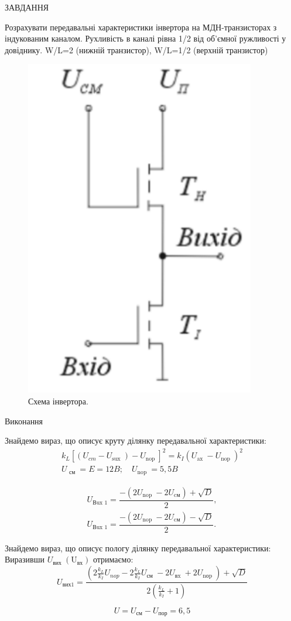 \documentclass[a4paper,14pt]{extreport}
\begin{document}
\begin{center}ЗАВДАННЯ\end{center}

Розрахувати передавальні характеристики інвертора на МДН-транзисторах з 
індукованим каналом. Рухливість в каналі рівна 1/2 від об'ємної ружливості у довіднику. 
W/L=2 (нижній транзистор), W/L=1/2 (верхній транзистор)



\begin{figure}[h]
  \begin{center}
    \includegraphics[width= 0.25\linewidth]{1.png}
  \end{center}
  \caption{Схема інвертора.}
\end{figure}

\begin{center}Виконання\end{center}

Знайдемо вираз, що описує круту ділянку передавальної характеристики:
$$
\begin{array}{c}
k_{L}\left[\left(U_{cm}-U_{\text {sux }}\right)-U_{\text {nop }}\right]^{2}=k_{I}\left(U_{\text {ax }}-U_{\text {nop }}\right)^{2} \\
U_{\text { см }}=E=12 B; \quad U_{\text {nop }}=5,5 B
\end{array}
$$


$$
\begin{array}{c}
U_{\text {Вux } 1}=\dfrac{-\left(2 U_{\text {nop }}-2 U_{\text {cм}}\right)+\sqrt{D}}{2}, \\
U_{\text {Вux } 1}=\dfrac{-\left(2 U_{\text {nop }}-2 U_{\text {cм}}\right)-\sqrt{D}}{2} .
\end{array}
$$

Знайдемо вираз, що описує пологу ділянку передавальної характеристики:
Виразивши $U_{\text {вих }}\left(\mathrm{U}_{\text{вх}}\right)$ отримаємо:
$$
U_{\text {вих1}}=\frac{\left(2 \frac{k_{L}}{k_{I}} U_{nop}-2 \frac{k_{L}}{k_{I}} U_{\text {см }}-2 U_{\text {вx }}+2 U_{\text {nоp }}\right)+\sqrt{D}}{2\left(\frac{k_{L}}{k_{I}}+1\right)}
$$


$$ U = U_{\text{см}} - U_{\text{пор}} = 6,5$$
\end{document}
